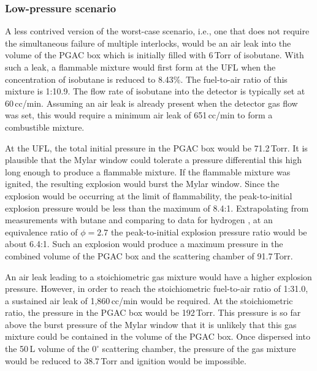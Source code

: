 \subsubsection{Low-pressure scenario}
\label{low_pres}
A less contrived version of the worst-case scenario, i.e., one that does not require the simultaneous failure of multiple interlocks, would be an %
air leak into the volume of the PGAC box which is initially filled with 6\,Torr of isobutane.  With such a leak, %
a flammable mixture would first form at the UFL when the concentration of isobutane is reduced to 8.43\%.  The fuel-to-air ratio of this mixture is 1:10.9.  The flow rate of isobutane into the detector is typically set at 60\,cc/min.
 Assuming an air leak is already present when the detector gas flow was set, this would require a minimum air leak of 651\,cc/min
to form a combustible mixture.  

At the UFL, the total initial pressure in the PGAC box would be 71.2\,Torr. %
  It is plausible %
that the Mylar window could tolerate a pressure differential this high long enough to produce a flammable mixture.  If the flammable mixture was ignited, the resulting explosion would burst the Mylar window.  Since the explosion would be occurring at the limit of flammability, the peak-to-initial explosion pressure would be less than the maximum of 8.4:1.  Extrapolating from measurements with butane \cite{Razus_2007} and comparing to data for hydrogen \cite{Dahoe_2005}, at an equivalence ratio of $\phi=2.7$ the peak-to-initial explosion pressure ratio would be about 6.4:1.  Such an explosion would produce a maximum pressure in the combined  volume of the PGAC box and the scattering chamber of 91.7\,Torr. %

An air leak leading to a stoichiometric gas mixture would have a higher explosion pressure.  However, in order to reach the stoichiometric fuel-to-air ratio of 1:31.0, a sustained air leak of 
1,860\,cc/min
 would be required.  At the stoichiometric ratio, the pressure in the PGAC box would be 
 192\,Torr. %
   This pressure is %
 so far above the
 burst pressure of the Mylar window that %
 it is unlikely that this gas mixture could be contained in the volume of the PGAC box.  Once dispersed into the 50\,L volume of the $0^\circ$ scattering chamber, the pressure of the gas mixture would be reduced to 38.7\,Torr %
 and ignition would be impossible.

